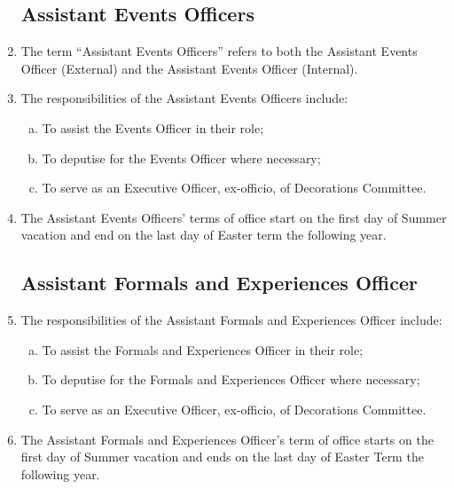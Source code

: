 \documentclass[12pt]{article}
\begin{document}
\begin{enumerate}
    \subsection{Assistant Events Officers}
    \item The term ``Assistant Events Officers'' refers to both the Assistant Events Officer (External) and the Assistant Events Officer (Internal).
    \item The responsibilities of the Assistant Events Officers include:
    \begin{enumerate}[(a)]
        \item To assist the Events Officer in their role;
        \item To deputise for the Events Officer where necessary;
        \item To serve as an Executive Officer, ex-officio, of Decorations Committee.
    \end{enumerate}
    \item The Assistant Events Officers' terms of office start on the first day of Summer vacation and end on the last day of Easter term the following year.

    \subsection{Assistant Formals and Experiences Officer}
    \item The responsibilities of the Assistant Formals and Experiences Officer include:
    \begin{enumerate}[(a)]
        \item To assist the Formals and Experiences Officer in their role;
        \item To deputise for the Formals and Experiences Officer where necessary;
        \item To serve as an Executive Officer, ex-officio, of Decorations Committee.
    \end{enumerate}
    \item The Assistant Formals and Experiences Officer's term of office starts on the first day of Summer vacation and ends on the last day of Easter Term the following year.


\end{enumerate}
\end{document}
